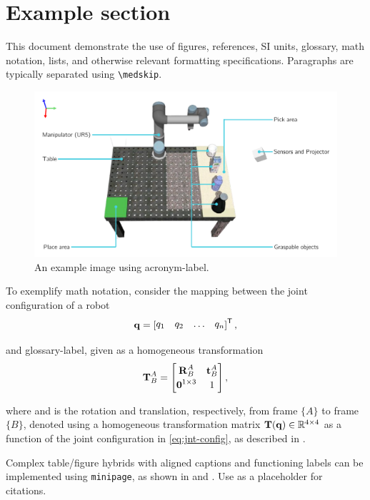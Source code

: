 \chapter{Example section}\label{ch:example}

This document demonstrate the use of figures, references, SI units, glossary, math notation, lists, and otherwise relevant formatting specifications. Paragraphs are typically separated using \texttt{\textbackslash medskip}.\medskip

\begin{figure}[H]
    \centering
    \includegraphics[width=.6\linewidth]{chapters/example/fig/figure.pdf}
    \caption{An example image using \acrlong{acronym-label}.}
    \label{fig:example-figure}
\end{figure}

To exemplify math notation, consider the mapping between the joint configuration of a robot
%
\begin{equation}
    \vec{q} = \rvec{q_1 & q_2 & \dots & q_n}\T,
    \label{eq:jnt-config}
\end{equation}

and \gls{glossary-label}, given as a homogeneous transformation
%
\begin{equation}
    \renewcommand{\arraystretch}{1.2}
    \tf{A}{B} = \begin{bmatrix}
        \tf[R]{A}{B}         & \tf[t]{A}{B} \\
        \vec{0}^{1 \times 3} & 1 
    \end{bmatrix},
\end{equation}

where  and  is the rotation and translation, respectively, from frame $\{A\}$ to frame $\{B\}$, denoted using a homogeneous transformation matrix $\bm{\mathrm{T}}(\bm{\mathrm{q}}) \in \mathbb{R}^{4 \times 4}$ as a function of the joint configuration in \eqref{eq:jnt-config}, as described in \cite{robotics-book}.\medskip

Complex table/figure hybrids with aligned captions and functioning labels can be implemented using \texttt{minipage}, as shown in  and . Use \fakecite as a placeholder for citations.

